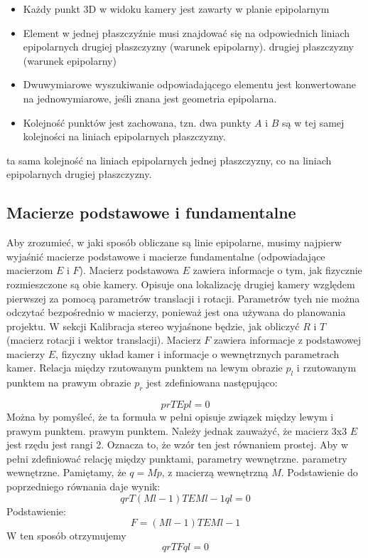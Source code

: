 \documentclass[magisterska]{pracadypl}
\begin{document}
\begin{itemize}
  \item Każdy punkt 3D w widoku kamery jest zawarty w planie epipolarnym
  \item Element w jednej płaszczyźnie musi znajdować się na odpowiednich liniach epipolarnych drugiej płaszczyzny (warunek epipolarny).
drugiej płaszczyzny (warunek epipolarny)
  \item Dwuwymiarowe wyszukiwanie odpowiadającego elementu jest konwertowane na
jednowymiarowe, jeśli znana jest geometria epipolarna.
  \item Kolejność punktów jest zachowana, tzn. dwa punkty $A$ i $B$ są w tej samej kolejności na liniach epipolarnych płaszczyzny.

\end{itemize}

ta sama kolejność na liniach epipolarnych jednej płaszczyzny, co na liniach epipolarnych drugiej płaszczyzny.

\subsection{Macierze podstawowe i fundamentalne}

Aby zrozumieć, w jaki sposób obliczane są linie epipolarne, musimy najpierw wyjaśnić macierze podstawowe
i macierze fundamentalne (odpowiadające macierzom $E$ i $F$).
Macierz podstawowa $E$ zawiera informacje o tym, jak fizycznie rozmieszczone są obie kamery.
Opisuje ona lokalizację drugiej kamery względem pierwszej za pomocą parametrów translacji i rotacji.
Parametrów tych nie można odczytać bezpośrednio w macierzy, ponieważ jest ona używana do planowania projektu. W sekcji Kalibracja stereo wyjaśnone będzie, jak obliczyć $R$ i $T$ (macierz rotacji i wektor translacji).
Macierz $F$ zawiera informacje z podstawowej macierzy $E$, fizyczny układ kamer i informacje o wewnętrznych parametrach kamer.
Relacja między rzutowanym punktem na lewym obrazie $p_l$ i rzutowanym punktem na prawym obrazie $p_r$ jest zdefiniowana następująco:

\[prTEpl=0\]
Można by pomyśleć, że ta formuła w pełni opisuje związek między lewym i prawym punktem.
prawym punktem. Należy jednak zauważyć, że macierz 3x3 $E$ jest rzędu
jest rangi 2. Oznacza to, że wzór ten jest równaniem prostej.
Aby w pełni zdefiniować relację między punktami, parametry wewnętrzne.
parametry wewnętrzne.
Pamiętamy, że $q = Mp$, z macierzą wewnętrzną $M$.
Podstawienie do poprzedniego równania daje wynik:
\[qrT(Ml-1)TEMl-1ql=0\]
Podstawienie:\\
\[F=(Ml-1)TEMl-1\]
W ten sposób otrzymujemy\\
\[qrTFql=0\]
\end{document}
